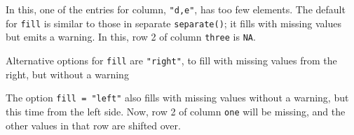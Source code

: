 \documentclass[]{book}
\newenvironment{Shaded}{\begin{snugshade}}{\end{snugshade}}
\newcommand{\CommentTok}[1]{\textcolor[rgb]{0.56,0.35,0.01}{\textit{#1}}}
\newcommand{\DataTypeTok}[1]{\textcolor[rgb]{0.13,0.29,0.53}{#1}}
\newcommand{\KeywordTok}[1]{\textcolor[rgb]{0.13,0.29,0.53}{\textbf{#1}}}
\newcommand{\NormalTok}[1]{#1}
\newcommand{\OperatorTok}[1]{\textcolor[rgb]{0.81,0.36,0.00}{\textbf{#1}}}
\newcommand{\StringTok}[1]{\textcolor[rgb]{0.31,0.60,0.02}{#1}}
\theoremstyle{plain}
\theoremstyle{remark}
\begin{document}
In this, one of the entries for column, \texttt{"d,e"}, has too few elements.
The default for \texttt{fill} is similar to those in separate \texttt{separate()}; it fills with missing values but emits a warning. In this, row 2 of column \texttt{three} is \texttt{NA}.

\begin{Shaded}
\end{Shaded}

Alternative options for \texttt{fill} are \texttt{"right"}, to fill with missing values from the right, but without a warning

\begin{Shaded}
\end{Shaded}

The option \texttt{fill\ =\ "left"} also fills with missing values without a warning, but this time from the left side.
Now, row 2 of column \texttt{one} will be missing, and the other values in that row are shifted over.
\end{document}
